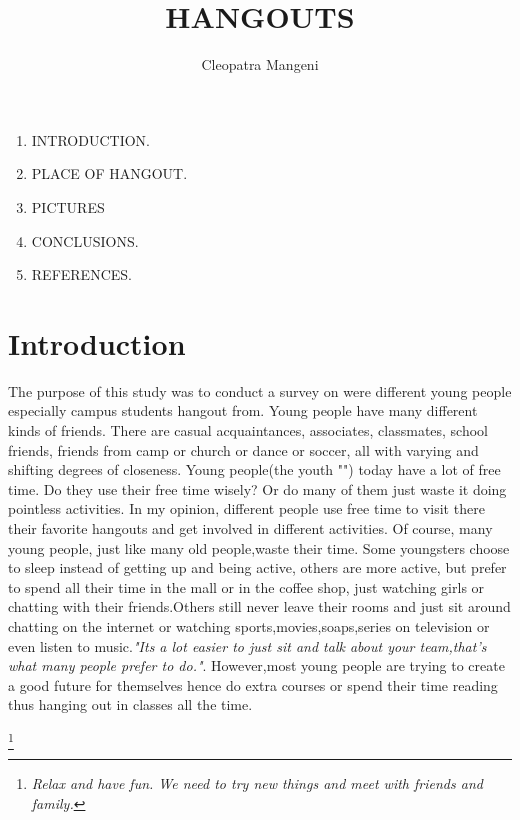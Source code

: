 \documentclass{article}
\begin{document}
\title{\textbf{HANGOUTS}}
\author{Cleopatra Mangeni}
\maketitle

\begin{enumerate}
\item INTRODUCTION.
\item PLACE OF HANGOUT.
\item PICTURES
\item CONCLUSIONS.
\item REFERENCES.
\end{enumerate}


\section{\textbf{Introduction}}
The purpose of this study was to conduct a survey on were different young people especially campus students hangout from.
Young people have many different kinds of friends. There are casual acquaintances, associates, classmates, school friends, friends from camp or church or dance or soccer, all with varying and shifting degrees of closeness.
Young people(the youth "") today have a lot of free time. Do they use their free time wisely? Or do many of them just waste it doing pointless activities. In my opinion, different people use free time to visit there their favorite hangouts and get involved in different activities.
\setlength{\parindent}{10ex}Of course, many young people, just like many old people,waste their time. Some youngsters choose to sleep instead of getting up and being active, others are more active, but prefer to spend all their time in the mall or in the coffee shop, just watching girls or chatting with their friends.Others still never leave their rooms and just sit around chatting on the internet or watching sports,movies,soaps,series on television or even listen to music.\textit{"Its a lot easier to just sit and talk about your team,that's what many people prefer to do."}.
However,most young people are trying to create a good future for themselves hence do extra courses or spend their time reading thus hanging out in classes all the time.\par
\noindent
\footnote{\it Relax and have fun. We need to try new things and meet with friends and family.}
\end{document}
